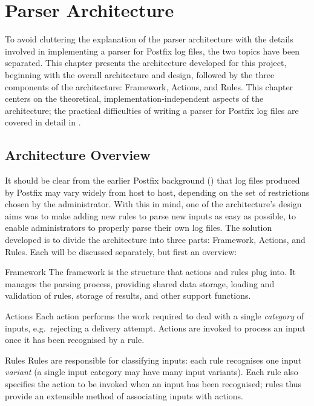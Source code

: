 \chapter{Parser Architecture}

\label{parser architecture}

To avoid cluttering the explanation of the parser architecture with the
details involved in implementing a parser for Postfix log files, the two
topics have been separated.  This chapter presents the architecture
developed for this project, beginning with the overall architecture and
design, followed by the three components of the architecture: Framework,
Actions, and Rules.  This chapter centers on the theoretical,
implementation-independent aspects of the architecture; the practical
difficulties of writing a parser for Postfix log files are covered in
detail in .

\section{Architecture Overview}

\label{parser design}

It should be clear from the earlier Postfix background () that log files produced by Postfix may vary widely from host
to host, depending on the set of restrictions chosen by the administrator.
With this in mind, one of the architecture's design aims was to make adding
new rules to parse new inputs as easy as possible, to enable administrators
to properly parse their own log files.  The solution developed is to divide
the architecture into three parts: Framework, Actions, and Rules.  Each
will be discussed separately, but first an overview:

\begin{eqlist}

    \item [Framework]  The framework is the structure that actions and
        rules plug into.  It manages the parsing process, providing shared
        data storage, loading and validation of rules, storage of results,
        and other support functions.

    \item [Actions] Each action performs the work required to deal with a
        single \textit{category\/} of inputs, e.g.\ rejecting a delivery
        attempt.  Actions are invoked to process an input once it has been
        recognised by a rule.

    \item [Rules]  Rules are responsible for classifying inputs: each rule
        recognises one input \textit{variant\/} (a single input category
        may have many input variants).  Each rule also specifies the action
        to be invoked when an input has been recognised; rules thus provide
        an extensible method of associating inputs with actions.

\end{eqlist}

